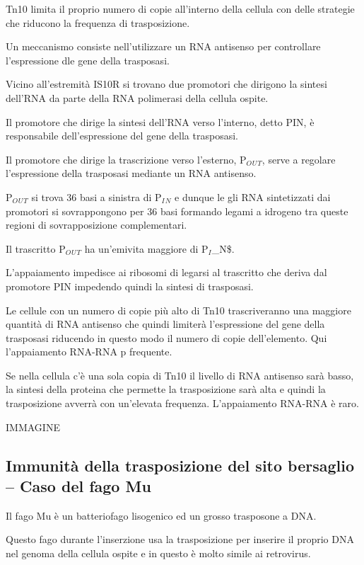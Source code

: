 \documentclass[11pt]{book}
\begin{document}
Tn10 limita il proprio numero di copie all'interno della cellula con
delle strategie che riducono la frequenza di trasposizione.

Un meccanismo consiste nell'utilizzare un RNA antisenso per controllare
l'espressione dle gene della trasposasi.

Vicino all'estremità IS10R si trovano due promotori che dirigono la
sintesi dell'RNA da parte della RNA polimerasi della cellula ospite.

Il promotore che dirige la sintesi dell'RNA verso l'interno, detto PIN,
è responsabile dell'espressione del gene della trasposasi.

Il promotore che dirige la trascrizione verso l'esterno,
P\(_O\)\(_U\)\(_T\), serve a regolare l'espressione della trasposasi
mediante un RNA antisenso.

P\(_O\)\(_U\)\(_T\) si trova 36 basi a sinistra di P\(_I\)\(_N\) e
dunque le gli RNA sintetizzati dai promotori si sovrappongono per 36
basi formando legami a idrogeno tra queste regioni di sovrapposizione
complementari.

Il trascritto P\(_O\)\(_U\)\(_T\) ha un'emivita maggiore di
P\(_I\)\_N\$.

L'appaiamento impedisce ai ribosomi di legarsi al trascritto che deriva
dal promotore PIN impedendo quindi la sintesi di trasposasi.

Le cellule con un numero di copie più alto di Tn10 trascriveranno una
maggiore quantità di RNA antisenso che quindi limiterà l'espressione del
gene della trasposasi riducendo in questo modo il numero di copie
dell'elemento. Qui l'appaiamento RNA-RNA p frequente.

Se nella cellula c'è una sola copia di Tn10 il livello di RNA antisenso
sarà basso, la sintesi della proteina che permette la trasposizione sarà
alta e quindi la trasposizione avverrà con un'elevata frequenza.
L'appaiamento RNA-RNA è raro.

IMMAGINE

\subsection{Immunità della trasposizione del sito bersaglio -- Caso del
fago
Mu}\label{immunituxe0-della-trasposizione-del-sito-bersaglio-caso-del-fago-mu}

Il fago Mu è un batteriofago lisogenico ed un grosso trasposone a DNA.

Questo fago durante l'inserzione usa la trasposizione per inserire il
proprio DNA nel genoma della cellula ospite e in questo è molto simile
ai retrovirus.
\end{document}
